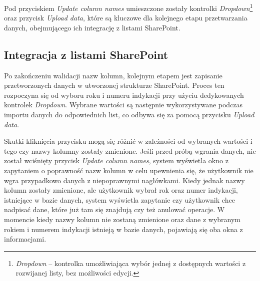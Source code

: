 Pod przyciskiem \emph{Update column names} umieszczone zostały kontrolki \emph{Dropdown}\footnote{\emph{Dropdown} -- kontrolka umożliwiająca wybór jednej z dostępnych wartości z rozwijanej listy, bez możliwości edycji.} oraz przycisk \emph{Upload data}, które są kluczowe dla kolejnego etapu przetwarzania danych, obejmującego ich integrację z listami SharePoint.



\subsection{Integracja z listami SharePoint} Po zakończeniu walidacji nazw kolumn, kolejnym etapem jest zapisanie przetworzonych danych w utworzonej strukturze SharePoint. Proces ten rozpoczyna się od wyboru roku i numeru indykacji przy użyciu dedykowanych kontrolek \emph{Dropdown}. Wybrane wartości są następnie wykorzystywane podczas importu danych do odpowiednich list, co odbywa się za pomocą przycisku \emph{Upload data}.

Skutki kliknięcia przycisku mogą się różnić w zależności od wybranych wartości i tego czy nazwy kolumny zostały zmienione. Jeśli przed próbą wgrania danych, nie został wciśnięty przycisk \emph{Update column names}, system wyświetla okno z zapytaniem o poprawność nazw kolumn w celu upewnienia się, że użytkownik nie wgra przypadkowo danych z niepoprawnymi nagłówkami.
Kiedy jednak nazwy kolumn zostały zmienione, ale użytkownik wybrał rok oraz numer indykacji, istniejące w bazie danych, system wyświetla zapytanie czy użytkownik chce nadpisać dane, które już tam się znajdują czy też anulować operacje. W momencie kiedy nazwy kolumn nie zostaną zmienione oraz dane z wybranym rokiem i numerem indykacji istnieją w bazie danych, pojawiają się oba okna z informacjami.



